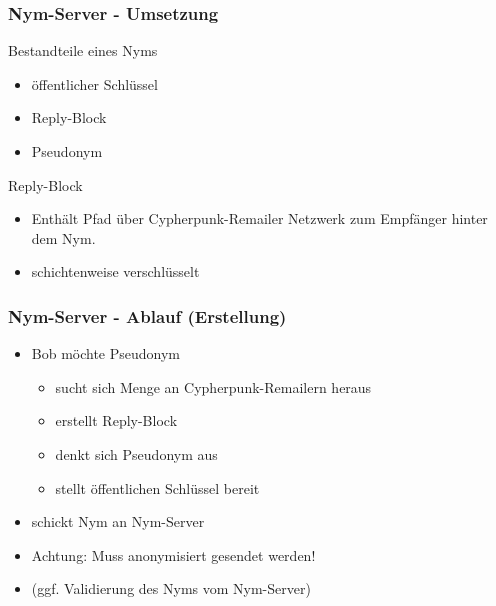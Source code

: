 \documentclass{beamer}
\begin{document}
\begin{frame}
	\frametitle{Nym-Server - Umsetzung}

	\begin{block}{Bestandteile eines Nyms}
		\begin{itemize}
			\item öffentlicher Schlüssel
			\item Reply-Block
			\item Pseudonym
		\end{itemize}
	\end{block}

	\pause

	\begin{block}{Reply-Block}
		\begin{itemize}
			\item Enthält Pfad über Cypherpunk-Remailer Netzwerk zum Empfänger hinter dem Nym.
			\item schichtenweise verschlüsselt
		\end{itemize}
	\end{block}
\end{frame}

\begin{frame}
	\frametitle{Nym-Server - Ablauf (Erstellung)}

	\begin{itemize}
		\item Bob möchte Pseudonym
		\begin{itemize}
			\item sucht sich Menge an Cypherpunk-Remailern heraus
			\item erstellt Reply-Block
			\item denkt sich Pseudonym aus
			\item stellt öffentlichen Schlüssel bereit
		\end{itemize}
		\item schickt Nym an Nym-Server
		\item Achtung: Muss anonymisiert gesendet werden!
		\item (ggf. Validierung des Nyms vom Nym-Server)
	\end{itemize}
\end{frame}
\end{document}
